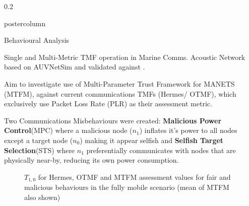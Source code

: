 \documentclass[final,hyperref={pdfpagelabels=false}]{beamer}
\def\colwidth{0.2\linewidth}
\begin{document}
\begin{frame}[fragile]
\begin{columns}[T]
\begin{column}{\colwidth}
\begin{beamercolorbox}[center,wd=\textwidth]{postercolumn}
\begin{minipage}[T]{.98\textwidth}
{\begin{block}{Behavioural Analysis}
						\end{block}
						
						\begin{block}{Single and Multi-Metric TMF operation in Marine Comms.}
							Acoustic Network based on AUVNetSim \cite{Miquel2008} and validated against \cite{Stefanov2011}.
							
							\vspace{0.25\baselineskip}
														
							Aim to investigate use of Multi-Parameter Trust Framework for MANETS (MTFM), against current communications TMFs (Hermes/ OTMF), which exclusively use Packet Loss Rate (PLR) as their assessment metric.  
							
							\vspace{0.25\baselineskip}
														
							Two Communications Misbehaviours were created: \textbf{Malicious Power Control}(MPC) where a malicious node ($n_1$) inflates it's power to all nodes except a target node ($n_0$) making it appear selfish and \textbf{Selfish Target Selection}(STS) where $n_1$ preferentially communicates with nodes that are physically near-by, reducing its own power consumption.
							
							\begin{figure}[t]
								\caption{$T_{1,0}$ for Hermes, OTMF and MTFM assessment values for fair and malicious behaviours in the fully mobile scenario (mean of MTFM also shown)}
								\label{fig:otmf_beta_comparison}
							\end{figure}
							

\end{block}}
\end{minipage}
\end{beamercolorbox}
\end{column}
\end{columns}
\end{frame}
\end{document}

